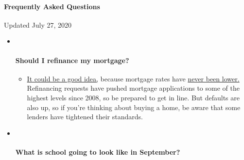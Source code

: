 \hypertarget{frequently-asked-questions}{%
\paragraph{Frequently Asked
Questions}\label{frequently-asked-questions}}

Updated July 27, 2020

\begin{itemize}
\item ~
  \hypertarget{should-i-refinance-my-mortgage}{%
  \paragraph{Should I refinance my
  mortgage?}\label{should-i-refinance-my-mortgage}}

  \begin{itemize}
  \tightlist
  \item
    \href{https://www.nytimes.com/article/coronavirus-money-unemployment.html?action=click\&pgtype=Article\&state=default\&region=MAIN_CONTENT_3\&context=storylines_faq}{It
    could be a good idea,} because mortgage rates have
    \href{https://www.nytimes.com/2020/07/16/business/mortgage-rates-below-3-percent.html?action=click\&pgtype=Article\&state=default\&region=MAIN_CONTENT_3\&context=storylines_faq}{never
    been lower.} Refinancing requests have pushed mortgage applications
    to some of the highest levels since 2008, so be prepared to get in
    line. But defaults are also up, so if you're thinking about buying a
    home, be aware that some lenders have tightened their standards.
  \end{itemize}
\item ~
  \hypertarget{what-is-school-going-to-look-like-in-september}{%
  \paragraph{What is school going to look like in
  September?}\label{what-is-school-going-to-look-like-in-september}}


\end{itemize}
